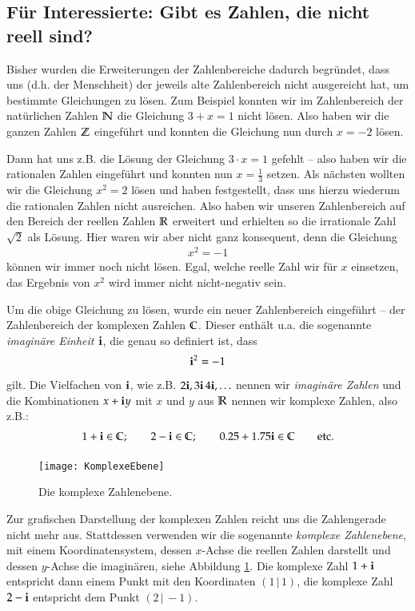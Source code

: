 \subsection{Für Interessierte: Gibt es Zahlen, die nicht reell sind?}
Bisher wurden die Erweiterungen der Zahlenbereiche dadurch begründet, dass uns (d.h. der Menschheit) der jeweils alte Zahlenbereich nicht ausgereicht hat, um bestimmte Gleichungen zu lösen.
Zum Beispiel konnten wir im Zahlenbereich der natürlichen Zahlen $\mathbb{N}$ die Gleichung $3 + x = 1$ nicht lösen.
Also haben wir die ganzen Zahlen $\mathbb{Z}$ eingeführt und konnten die Gleichung nun durch $x = -2$ lösen.

Dann hat uns z.B. die Lösung der Gleichung $3\cdot x = 1$ gefehlt -- also haben wir die rationalen Zahlen eingeführt und konnten nun $x = \frac{1}{3}$ setzen.
Als nächsten wollten wir die Gleichung $x^2 = 2$ lösen und haben festgestellt, dass uns hierzu wiederum die rationalen Zahlen nicht ausreichen.
Also haben wir unseren Zahlenbereich auf den Bereich der reellen Zahlen $\mathbb{R}$ erweitert und erhielten so die irrationale Zahl $\sqrt{2}$ als Lösung.
Hier waren wir aber nicht ganz konsequent, denn die Gleichung
\begin{align*}
	x^2 = -1
\end{align*}
können wir immer noch nicht lösen.
Egal, welche reelle Zahl wir für $x$ einsetzen, das Ergebnis von $x^2$ wird immer nicht nicht-negativ sein.

Um die obige Gleichung zu lösen, wurde ein neuer Zahlenbereich eingeführt -- der Zahlenbereich der komplexen Zahlen $\mathbb{C}$.
Dieser enthält u.a. die sogenannte \emph{imaginäre Einheit $\mathbf{i}$}, die genau so definiert ist, dass
\begin{align*}
	\mathbf{i}^2 = -1
\end{align*}
gilt.
Die Vielfachen von $\mathbf{i}$, wie z.B. $2\mathbf{i}, 3\mathbf{i}\, 4\mathbf{i}, \ldots$ nennen wir \emph{imaginäre Zahlen} und die Kombinationen $x + \mathbf{i} y$ mit $x$ und $y$ aus $\mathbb{R}$ nennen wir komplexe Zahlen, also z.B.:
\begin{align*}
	1 + \mathbf{i} \in \mathbb{C};\qquad 2 - \mathbf{i} \in \mathbb{C};\qquad 0.25 + 1.75\mathbf{i} \in \mathbb{C} \qquad \text{etc.}
\end{align*}

\begin{figure}
	\texttt{[image: KomplexeEbene]}
	\caption{Die komplexe Zahlenebene.}
	\label{fig:complexPlain}
\end{figure}
Zur grafischen Darstellung der komplexen Zahlen reicht uns die Zahlengerade nicht mehr aus.
Stattdessen verwenden wir die sogenannte \emph{komplexe Zahlenebene}, mit einem Koordinatensystem, dessen $x$-Achse die reellen Zahlen darstellt und dessen $y$-Achse die imaginären, siehe Abbildung \ref{fig:complexPlain}.
Die komplexe Zahl $1 + \mathbf{i}$ entspricht dann einem Punkt mit den Koordinaten $(1\,|\,1)$, die komplexe Zahl $2 - \mathbf{i}$ entspricht dem Punkt $(2\,|\,-1)$.

